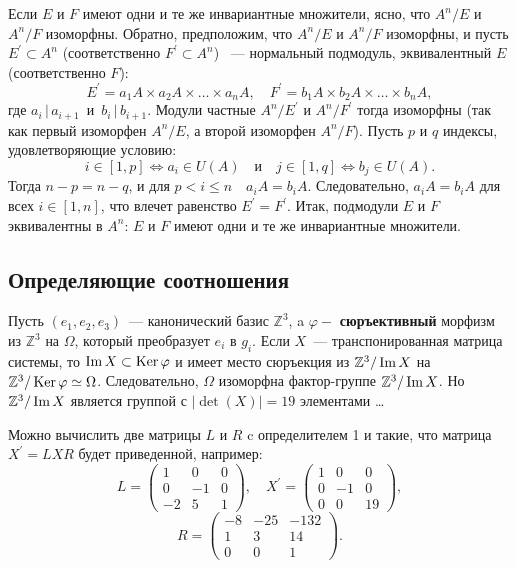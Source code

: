     Если $E$ и $F$ имеют одни и те же инвариантные множители, ясно, что $A^n/E$ и $A^n/F$ изоморфны. Обратно, предположим, что $A^n/E$ и $A^n/F$ изоморфны, и пусть $E^\prime \subset A^n$ (соответственно $F^\prime \subset A^n$) ~— нормальный подмодуль, эквивалентный $E$ (соответственно $F$):
    $$E^\prime = a_1A \times a_2A \times \ldots \times a_nA,\quad F^\prime = b_1A \times b_2A \times \ldots \times b_nA,$$
    где $a_i\,|\,a_{i+1}\,$ и $\,b_i\,|\,b_{i+1}$. Модули частные $A^n/E^\prime$ и $A^n/F^\prime$ тогда изоморфны (так как первый изоморфен $A^n/E$, а второй изоморфен $A^n/F$). Пусть $p$ и $q$ индексы, удовлетворяющие условию:
    $$i \in [1, p] \Leftrightarrow a_i \in U(A)\quad\mathrm{и}\quad j \in [1, q] \Leftrightarrow b_j \in U(A).$$
    Тогда $n-p = n-q$, и для $p < i \leqslant n\quad a_iA = b_iA$. Следовательно, $a_iA = b_iA$ для всех $i \in [1, n]$, что влечет равенство $E^\prime = F^\prime$. Итак, подмодули $E$ и $F$ эквивалентны в $A^n$: $E$ и $F$ имеют одни и те же инвариантные множители.



    \subsection{\normalsize{Определяющие соотношения}}

    Пусть $(e_1, e_2, e_3)$~— канонический базис $\mathbb{Z}^3$, a $\varphi -$ {\bf{сюръективный}} морфизм из $\mathbb{Z}^3$ на $\Omega$, который преобразует $e_i$ в $g_i$. Если $X$~— транспонированная матрица системы, то $\operatorname{Im} X \subset \operatorname{Ker}\varphi$ и имеет место сюръекция из $\mathbb{Z}^3/\operatorname{Im} X$ на $\mathbb{Z}^3/\operatorname{Ker}\varphi \simeq \Omega$. Следовательно, $\Omega$ изоморфна фактор-группе $\mathbb{Z}^3/\operatorname{Im} X$. Но $\mathbb{Z}^3/\operatorname{Im} X$ является группой с $|\det(X)| = 19$ элементами \ldots

    Можно вычислить две матрицы $L$ и $R$ c определителем 1 и такие, что матрица $X^\prime = LXR$ будет приведенной, например:
    $$ L = \begin{pmatrix}
    1 & 0 & 0\\
    0 & -1 & 0\\
    -2 & 5 & 1
    \end{pmatrix},\quad X^\prime = \begin{pmatrix}
    1 & 0 & 0\\
    0 & -1 & 0\\
    0 & 0 & 19
    \end{pmatrix},$$
    $$R = \begin{pmatrix}
    -8 & -25 & -132\\
    1 & 3 & 14\\
    0 & 0 & 1
    \end{pmatrix}.$$

